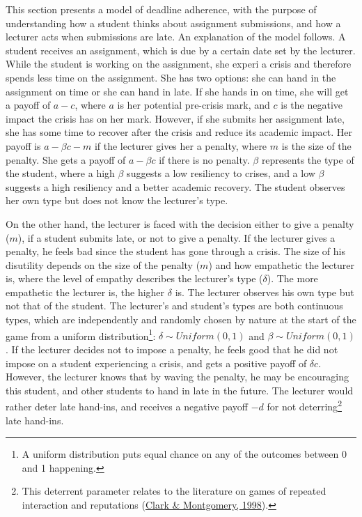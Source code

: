 \documentclass[11pt,preprint, authoryear]{elsarticle}
\numberwithin{equation}{section}
\numberwithin{figure}{section}
\numberwithin{table}{section}
\let\rmarkdownfootnote\footnote%
\def\footnote{\protect\rmarkdownfootnote}
\begin{document}
This section presents a model of deadline adherence, with the purpose of
understanding how a student thinks about assignment submissions, and how
a lecturer acts when submissions are late. An explanation of the model
follows. A student receives an assignment, which is due by a certain
date set by the lecturer. While the student is working on the
assignment, she experi a crisis and therefore spends less time on the
assignment. She has two options: she can hand in the assignment on time
or she can hand in late. If she hands in on time, she will get a payoff
of \(a-c\), where \(a\) is her potential pre-crisis mark, and \(c\) is
the negative impact the crisis has on her mark. However, if she submits
her assignment late, she has some time to recover after the crisis and
reduce its academic impact. Her payoff is \(a-\beta c -m\) if the
lecturer gives her a penalty, where \(m\) is the size of the penalty.
She gets a payoff of \(a-\beta c\) if there is no penalty. \(\beta\)
represents the type of the student, where a high \(\beta\) suggests a
low resiliency to crises, and a low \(\beta\) suggests a high resiliency
and a better academic recovery. The student observes her own type but
does not know the lecturer's type.

On the other hand, the lecturer is faced with the decision either to
give a penalty (\(m\)), if a student submits late, or not to give a
penalty. If the lecturer gives a penalty, he feels bad since the student
has gone through a crisis. The size of his disutility depends on the
size of the penalty (\(m\)) and how empathetic the lecturer is, where
the level of empathy describes the lecturer's type (\(\delta\)). The
more empathetic the lecturer is, the higher \(\delta\) is. The lecturer
observes his own type but not that of the student. The lecturer's and
student's types are both continuous types, which are independently and
randomly chosen by nature at the start of the game from a uniform
distribution\footnote{A uniform distribution puts equal chance on any of
  the outcomes between 0 and 1 happening.}: \(\delta \sim Uniform(0,1)\)
and \(\beta \sim Uniform(0,1)\). If the lecturer decides not to impose a
penalty, he feels good that he did not impose on a student experiencing
a crisis, and gets a positive payoff of \(\delta c\). However, the
lecturer knows that by waving the penalty, he may be encouraging this
student, and other students to hand in late in the future. The lecturer
would rather deter late hand-ins, and receives a negative payoff \(-d\)
for not deterring\footnote{This deterrent parameter relates to the
  literature on games of repeated interaction and reputations
  (\protect\hyperlink{ref-deter}{Clark \& Montgomery, 1998}).} late
hand-ins.
\end{document}
